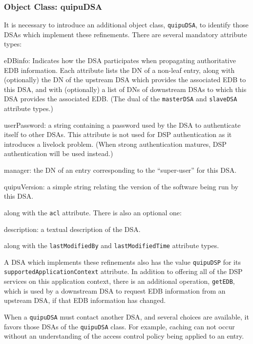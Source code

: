 \subsubsection	{Object Class: quipuDSA}
It is necessary to introduce an additional object class,
\verb"quipuDSA",
to identify those DSAs
which implement these refinements.
There are several mandatory attribute types:
\begin{describe}
\item[eDBinfo:]
			Indicates how the DSA participates when propagating
			authoritative EDB information.
			Each attribute lists the DN of a non-leaf entry,
			along with (optionally) the DN of the upstream DSA
			which provides the associated EDB to this DSA,
			and with (optionally) a list of DNs of downstream DSAs
			to which this DSA provides the associated EDB.
			(The dual of the \verb"masterDSA" and \verb"slaveDSA"
			attribute types.)

\item[userPassword:]
			a string containing a password used by the DSA to
			authenticate itself to other DSAs.
			This attribute is not used for DSP authentication
			as it introduces a livelock problem.
			(When strong authentication matures,
			DSP authentication will be used instead.)

\item[manager:]
			the DN of an entry corresponding to the ``super-user''
			for this DSA.

\item[quipuVersion:]
			a simple string relating the version of the software
			being run by this DSA.
\end{describe}
along with the \verb"acl" attribute.
There is also an optional one:
\begin{describe}
\item[description:]
			a textual description of the DSA.
\end{describe}
along with the \verb"lastModifiedBy" and \verb"lastModifiedTime" attribute
types.

A DSA which implements these refinements also has the value
\verb"quipuDSP" for its \verb"supportedApplicationContext" attribute.
In addition to offering all of the DSP services on this application context,
there is an additional operation,
\verb"getEDB",
which is used by a downstream DSA to request EDB information from an upstream
DSA,
if that EDB information has changed.

When a \verb"quipuDSA" must contact another DSA,
and several choices are available,
it favors those DSAs of the \verb"quipuDSA" class.
For example,
 caching can not occur without an understanding of the access control
policy being applied to an entry.

